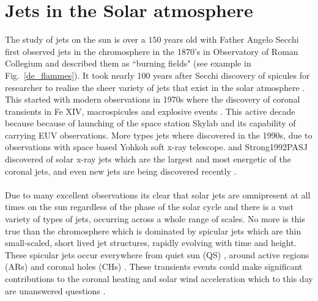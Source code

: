 \documentclass[12pt]{ociamthesis}
\newcommand{\np}{\\ \\}
\begin{document}
\section{Jets in the Solar atmosphere}
\label{sec:spicule-jets}
The study of jets on the sun is over a $150$ years old with Father Angelo Secchi first observed jets in the chromosphere in the 1870's in Observatory of Roman Collegium and described them as ``burning fields" (see example in Fig.~\ref{de_flammes}). It took nearly 100 years after Secchi discovery of spicules for researcher to realise the sheer variety of jets that exist in the solar atmosphere \citep{Raouafi2016}. This started with modern observations in 1970s where the discovery of coronal transients in Fe XIV, macrospicules and explosive events \citep{Demastus1973, Bohlin1975ApJ197L133B, Withbroe1976ApJ, Brueckner1980HiA}. This active decade because because of launching of the space station Skylab and its capability of carrying EUV observations. More types jets where discovered in the 1990s, due to observations with space based Yohkoh soft x-ray telescope. \cite{Shibata1992PASJ} and {Strong1992PASJ} discovered of solar x-ray jets which are the largest and most energetic of the coronal jets, and even new jets are being discovered recently \citep{Cho2019ApJ884L38C}. \np
%
Due to many excellent observations its clear that solar jets are omnipresent at all times on the sun regardless of the phase of the solar cycle and there is a vast variety of types of jets, occurring across a whole range of scales. No more is this true than the chromosphere which is dominated by spicular jets which are thin small-scaled, short lived jet structures, rapidly evolving with time and height. These spicular jets occur everywhere from quiet sun (QS) \citep{Pontieu2007astroph2081D,Rouppe2007ApJ660L169R,Pereira2012,Pereira2014ApJ}, around active regions (ARs) \citep{Pontieu2007astroph2081D,Pereira2012,Rouppe2013ApJ77656R,Gafeira2017ApJS2296G} and coronal holes (CHs) \citep{Yamauchi2005ApJ629572Y,Moreno2008ApJ673L211M,Pereira2012,Young2015ApJ801124Y}.  These transients events could make significant contributions to the coronal heating and solar wind acceleration which to this day are unanswered questions \citep{Martinez-Sykora2017, Pontieu2017ApJ, Samanta2019Sci, Zuo2019AcASn, Bale2019Natur}. \np
\end{document}

